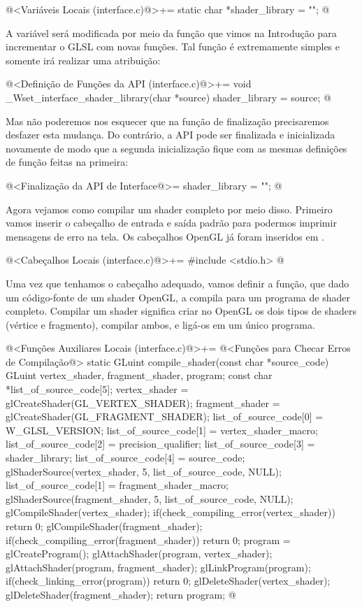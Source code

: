 \iniciocodigo
@<Variáveis Locais (interface.c)@>+=
static char *shader_library = "";
@
\fimcodigo

A variável será modificada por meio da função que vimos na Introdução
para incrementar o GLSL com novas funções. Tal função é extremamente
simples e somente irá realizar uma atribuição:

\iniciocodigo
@<Definição de Funções da API (interface.c)@>+=
void _Wset_interface_shader_library(char *source){
  shader_library = source;
}
@
\fimcodigo

Mas não poderemos nos esquecer que na função de finalização
precisaremos desfazer esta mudança. Do contrário, a API pode ser
finalizada e inicializada novamente de modo que a segunda
inicialização fique com as mesmas definições de função feitas na
primeira:

\iniciocodigo
@<Finalização da API de Interface@>=
shader_library = "";
@
\fimcodigo

Agora vejamos como compilar um shader completo por meio
disso. Primeiro vamos inserir o cabeçalho de entrada e saída padrão
para podermos imprimir mensagens de erro na tela. Os cabeçalhos OpenGL
já foram inseridos em .

\iniciocodigo
@<Cabeçalhos Locais (interface.c)@>+=
#include <stdio.h>
@
\fimcodigo

Uma vez que tenhamos o cabeçalho adequado, vamos definir a função, que
dado um código-fonte de um shader OpenGL, a compila para um programa
de shader completo. Compilar um shader significa criar no OpenGL os
dois tipos de shaders (vértice e fragmento), compilar ambos, e ligá-os
em um único programa.

\iniciocodigo
@<Funções Auxiliares Locais (interface.c)@>+=
@<Funções para Checar Erros de Compilação@>
static GLuint compile_shader(const char *source_code){
  GLuint vertex_shader, fragment_shader, program;
  const char *list_of_source_code[5];
  vertex_shader = glCreateShader(GL_VERTEX_SHADER);
  fragment_shader = glCreateShader(GL_FRAGMENT_SHADER);
  list_of_source_code[0] = W_GLSL_VERSION;
  list_of_source_code[1] = vertex_shader_macro;
  list_of_source_code[2] = precision_qualifier;
  list_of_source_code[3] = shader_library;
  list_of_source_code[4] = source_code;
  glShaderSource(vertex_shader, 5, list_of_source_code, NULL);
  list_of_source_code[1] = fragment_shader_macro;
  glShaderSource(fragment_shader, 5, list_of_source_code, NULL);
  glCompileShader(vertex_shader);
  if(check_compiling_error(vertex_shader))
    return 0;
  glCompileShader(fragment_shader);
  if(check_compiling_error(fragment_shader))
    return 0;
  program = glCreateProgram();
  glAttachShader(program, vertex_shader);
  glAttachShader(program, fragment_shader);
  glLinkProgram(program);
  if(check_linking_error(program))
    return 0;
  glDeleteShader(vertex_shader);
  glDeleteShader(fragment_shader);
  return program;
}
@
\fimcodigo

